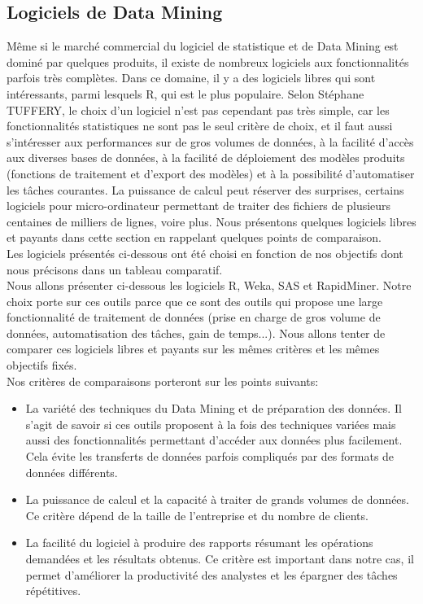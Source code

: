 \documentclass[11pt,a4paper]{report}
\begin{document}
\subsection{Logiciels de Data Mining \label{log_dm}}
Même si le marché commercial du logiciel de statistique et de Data Mining est dominé par quelques produits, il existe de nombreux logiciels aux fonctionnalités parfois très complètes. Dans ce domaine, il y a des logiciels libres qui sont intéressants, parmi lesquels R, qui est le plus populaire. Selon Stéphane TUFFERY, le choix d'un logiciel n'est pas cependant pas très simple, car les fonctionnalités statistiques ne sont pas le seul critère de choix, et il faut aussi s'intéresser aux performances sur de gros volumes de données, à la facilité d'accès aux diverses bases de données, à la facilité de déploiement des modèles produits (fonctions de traitement et d'export des modèles) et à la possibilité d'automatiser les tâches courantes. La puissance de calcul peut réserver des surprises, certains logiciels pour micro-ordinateur permettant de traiter des fichiers de plusieurs centaines de milliers de lignes, voire plus. Nous présentons quelques logiciels libres et payants dans cette section en rappelant quelques points de comparaison.\\
Les logiciels présentés ci-dessous ont été choisi en fonction de nos objectifs dont nous précisons dans un tableau comparatif. \\

Nous allons présenter ci-dessous les logiciels R, Weka, SAS et RapidMiner. Notre choix porte sur ces outils parce que ce sont des outils qui propose une large fonctionnalité de traitement de données (prise en charge de gros volume de données, automatisation des tâches, gain de temps...). Nous allons tenter de comparer ces logiciels libres et payants sur les mêmes critères et les mêmes objectifs fixés.\\

Nos critères de comparaisons porteront sur les points suivants: 
\begin{itemize}
\item La variété des techniques du Data Mining et de préparation des données. Il s'agit de savoir si ces outils proposent à la fois des techniques variées mais aussi des fonctionnalités permettant d'accéder aux données plus facilement. Cela évite les transferts de données parfois compliqués par des formats de données différents. 
\item  La puissance de calcul et la capacité à traiter de grands volumes de données. Ce critère dépend de la taille de l'entreprise et du nombre de clients. 
\item La facilité du logiciel à produire des rapports résumant les opérations demandées et les résultats obtenus.
Ce critère est important dans notre cas, il permet d'améliorer la productivité des analystes et les épargner des tâches répétitives. 
\end{itemize}
\end{document}
